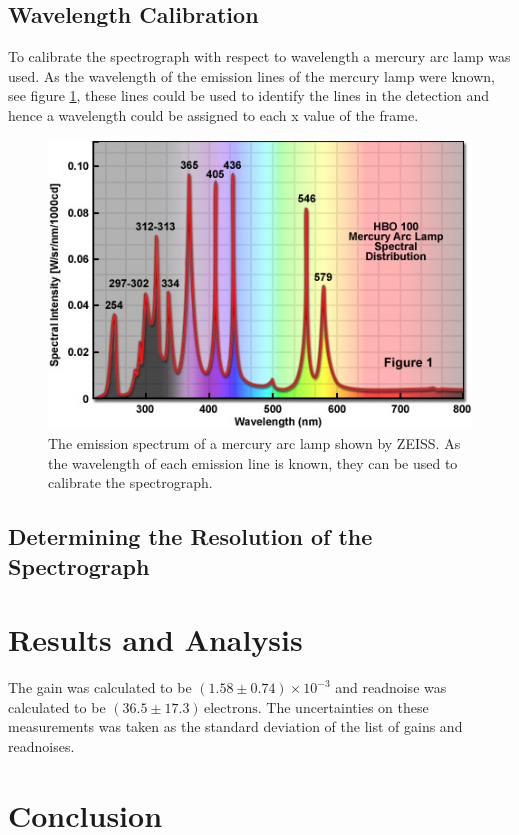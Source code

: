 \documentclass[a4paper,12pt,twocolumn]{article}
\let\cite=\supercite
\begin{document}
		\subsection{Wavelength Calibration}
			To calibrate the spectrograph with respect to wavelength a mercury arc lamp was used. As the wavelength of the emission lines of the mercury lamp were known, see figure \ref{fig:mercury}, these lines could be used to identify the lines in the detection and hence a wavelength could be assigned to each x value of the frame.
			
			\begin{figure}
				\includegraphics[width=\columnwidth]{mercurySpectrum.jpg}
				\captionsetup{font=scriptsize}
				\caption{The emission spectrum of a mercury arc lamp shown by ZEISS\cite{zeiss}. As the wavelength of each emission line is known, they can be used to calibrate the spectrograph.}
				\label{fig:mercury}
			\end{figure}
			
	
		\subsection{Determining the Resolution of the Spectrograph}
	
	\section{Results and Analysis}
		The gain was calculated to be $(1.58 \pm 0.74)\times 10^{-3}$ and readnoise was calculated to be $(36.5 \pm 17.3) \,\text{electrons}$. The uncertainties on these measurements was taken as the standard deviation of the list of gains and readnoises.
		
	
	\section{Conclusion}
	
	\printbibliography
\end{document}
